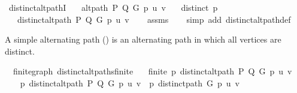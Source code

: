 \begin{isabellebody}
%
\isadelimproof
\isanewline
%
\endisadelimproof
%
\isadeliminvisible
\isanewline
%
\endisadeliminvisible
%
\isataginvisible
{}\isamarkupfalse%
\ distinct{\isacharunderscore}{\kern0pt}alt{\isacharunderscore}{\kern0pt}pathI{\isacharcolon}{\kern0pt}\isanewline
\ \ \ {\isachardoublequoteopen}alt{\isacharunderscore}{\kern0pt}path\ P\ Q\ G\ p\ u\ v{\isachardoublequoteclose}\isanewline
\ \ \ {\isachardoublequoteopen}distinct\ p{\isachardoublequoteclose}\isanewline
\ \ \ {\isachardoublequoteopen}distinct{\isacharunderscore}{\kern0pt}alt{\isacharunderscore}{\kern0pt}path\ P\ Q\ G\ p\ u\ v{\isachardoublequoteclose}%
\endisataginvisible
{\isafoldinvisible}%
%
\isadeliminvisible
\isanewline
%
\endisadeliminvisible
%
\isadelimproof
\ \ %
\endisadelimproof
%
\isatagproof
{}\isamarkupfalse%
\ assms\isanewline
\ \ \isamarkupfalse%
\ {\isacharparenleft}{\kern0pt}simp\ add{\isacharcolon}{\kern0pt}\ distinct{\isacharunderscore}{\kern0pt}alt{\isacharunderscore}{\kern0pt}path{\isacharunderscore}{\kern0pt}def{\isacharparenright}{\kern0pt}%
\endisatagproof
{\isafoldproof}%
%
\isadelimproof
%
\endisadelimproof
%
\begin{isamarkuptext}%
A simple alternating path () is an alternating path in which all vertices
are distinct.%
\end{isamarkuptext}\isamarkuptrue%
\isamarkupfalse%
\ {\isacharparenleft}{\kern0pt}\ finite{\isacharunderscore}{\kern0pt}graph{\isacharparenright}{\kern0pt}\ distinct{\isacharunderscore}{\kern0pt}alt{\isacharunderscore}{\kern0pt}paths{\isacharunderscore}{\kern0pt}finite{\isacharcolon}{\kern0pt}\isanewline
\ \ \ {\isachardoublequoteopen}finite\ {\isacharbraceleft}{\kern0pt}p{\isachardot}{\kern0pt}\ distinct{\isacharunderscore}{\kern0pt}alt{\isacharunderscore}{\kern0pt}path\ P\ Q\ G\ p\ u\ v{\isacharbraceright}{\kern0pt}{\isachardoublequoteclose}\isanewline
%
\isadelimproof
%
\endisadelimproof
%
\isatagproof
{}\isamarkupfalse%
\ {\isacharminus}{\kern0pt}\isanewline
\ \ \isamarkupfalse%
\ {\isachardoublequoteopen}{\isacharbraceleft}{\kern0pt}p{\isachardot}{\kern0pt}\ distinct{\isacharunderscore}{\kern0pt}alt{\isacharunderscore}{\kern0pt}path\ P\ Q\ G\ p\ u\ v{\isacharbraceright}{\kern0pt}\ {\isasymsubseteq}\ {\isacharbraceleft}{\kern0pt}p{\isachardot}{\kern0pt}\ distinct{\isacharunderscore}{\kern0pt}path\ G\ p\ u\ v{\isacharbraceright}{\kern0pt}{\isachardoublequoteclose}\isanewline

\end{isabellebody}
